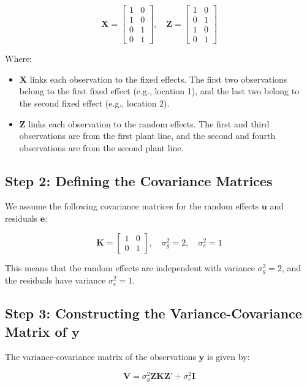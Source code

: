 \documentclass[12pt,a4paper]{article}
\begin{document}
\[
\mathbf{X} = 
\begin{bmatrix}
    1 & 0 \\
    1 & 0 \\
    0 & 1 \\
    0 & 1
\end{bmatrix}, \quad
\mathbf{Z} = 
\begin{bmatrix}
    1 & 0 \\
    0 & 1 \\
    1 & 0 \\
    0 & 1
\end{bmatrix}
\]

Where:
\begin{itemize}
    \item $\mathbf{X}$ links each observation to the fixed effects. The first two observations belong to the first fixed effect (e.g., location 1), and the last two belong to the second fixed effect (e.g., location 2).
    \item $\mathbf{Z}$ links each observation to the random effects. The first and third observations are from the first plant line, and the second and fourth observations are from the second plant line.
\end{itemize}

\subsection*{Step 2: Defining the Covariance Matrices}

We assume the following covariance matrices for the random effects $\mathbf{u}$ and residuals $\mathbf{e}$:

\[
\mathbf{K} = 
\begin{bmatrix}
    1 & 0 \\
    0 & 1
\end{bmatrix}, \quad
\sigma^2_g = 2, \quad \sigma^2_e = 1
\]

This means that the random effects are independent with variance $\sigma^2_g = 2$, and the residuals have variance $\sigma^2_e = 1$.

\subsection*{Step 3: Constructing the Variance-Covariance Matrix of $\mathbf{y}$}

The variance-covariance matrix of the observations $\mathbf{y}$ is given by:

\[
\mathbf{V} = \sigma^2_g \mathbf{ZKZ'} + \sigma^2_e \mathbf{I}
\]
\end{document}
